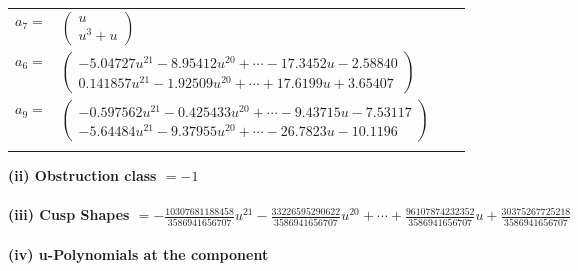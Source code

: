\documentclass[1p]{elsarticle_modified}
\theoremstyle{definition}
\begin{document}
\begin{tabular}{m{7pt} m{180pt} m{7pt} m{180pt} }
\flushright $a_{7}=$&$\begin{pmatrix}u\\u^3+u\end{pmatrix}$ \\
\flushright $a_{6}=$&$\begin{pmatrix}-5.04727 u^{21}-8.95412 u^{20}+\cdots-17.3452 u-2.58840\\0.141857 u^{21}-1.92509 u^{20}+\cdots+17.6199 u+3.65407\end{pmatrix}$ \\
\flushright $a_{9}=$&$\begin{pmatrix}-0.597562 u^{21}-0.425433 u^{20}+\cdots-9.43715 u-7.53117\\-5.64484 u^{21}-9.37955 u^{20}+\cdots-26.7823 u-10.1196\end{pmatrix}$\\&\end{tabular}
\flushleft \textbf{(ii) Obstruction class $= -1$}\\~\\
\flushleft \textbf{(iii) Cusp Shapes $= -\frac{10307681188458}{3586941656707} u^{21}-\frac{33226595290622}{3586941656707} u^{20}+\cdots+\frac{96107874232352}{3586941656707} u+\frac{30375267725218}{3586941656707}$}\\~\\
\newpage\renewcommand{\arraystretch}{1}
\flushleft \textbf{(iv) u-Polynomials at the component}\newline \\
\end{document}
